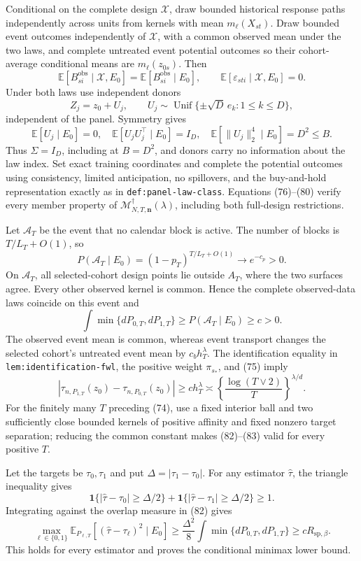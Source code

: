 Conditional on the complete design \(\mathscr X\), draw bounded historical response paths independently across units from kernels with mean \(m_\ell(X_{st})\).  Draw bounded event outcomes independently of \(\mathscr X\), with a common observed mean under the two laws, and complete untreated event potential outcomes so their cohort-average conditional means are \(m_\ell(z_{0s})\).  Then
\[
\mathbb E[B_{si}^{\mathrm{obs}}\mid\mathscr X,E_0]
=\mathbb E[B_{si}^{\mathrm{obs}}\mid E_0],
\qquad
\mathbb E[\varepsilon_{sti}\mid\mathscr X,E_0]=0.
\tag{79}
\]
Under both laws use independent donors
\[
Z_j=z_0+U_j,
\qquad
U_j\sim\operatorname{Unif}\{\pm\sqrt D\,e_k:1\leq k\leq D\},
\]
independent of the panel.  Symmetry gives
\[
\mathbb E[U_j\mid E_0]=0,
\quad
\mathbb E[U_jU_j^\top\mid E_0]=I_D,
\quad
\mathbb E[\|U_j\|_2^4\mid E_0]=D^2\leq B.
\tag{80}
\]
Thus \(\Sigma=I_D\), including at \(B=D^2\), and donors carry no information about the law index.  Set exact training coordinates and complete the potential outcomes using consistency, limited anticipation, no spillovers, and the buy-and-hold representation exactly as in \texttt{def:panel-law-class}.  Equations (76)--(80) verify every member property of \(\mathcal M_{N,T,\mathbf n}^{\dagger}(\lambda)\), including both full-design restrictions.

Let \(\mathcal A_T\) be the event that no calendar block is active.  The number of blocks is \(T/L_T+O(1)\), so
\[
P(\mathcal A_T\mid E_0)
=(1-p_T)^{T/L_T+O(1)}\longrightarrow e^{-c_p}>0.
\tag{81}
\]
On \(\mathcal A_T\), all selected-cohort design points lie outside \(A_T\), where the two surfaces agree.  Every other observed kernel is common.  Hence the complete observed-data laws coincide on this event and
\[
\int\min\{dP_{0,T},dP_{1,T}\}
\geq P(\mathcal A_T\mid E_0)\geq c>0.
\tag{82}
\]
The observed event mean is common, whereas event transport changes the selected cohort's untreated event mean by \(c_bh_T^\lambda\).  The identification equality in \texttt{lem:identification-fwl}, the positive weight \(\pi_{s_*}\), and (75) imply
\[
|\tau_{n,P_{1,T}}(z_0)-\tau_{n,P_{0,T}}(z_0)|
\geq ch_T^\lambda
\asymp\left\{\frac{\log(T\vee2)}T\right\}^{\lambda/d}.
\tag{83}
\]
For the finitely many \(T\) preceding (74), use a fixed interior ball and two sufficiently close bounded kernels of positive affinity and fixed nonzero target separation; reducing the common constant makes (82)--(83) valid for every positive \(T\).

Let the targets be \(\tau_0,\tau_1\) and put \(\Delta=|\tau_1-\tau_0|\).  For any estimator \(\widehat\tau\), the triangle inequality gives
\[
\mathbf1\{|\widehat\tau-\tau_0|\geq\Delta/2\}
+\mathbf1\{|\widehat\tau-\tau_1|\geq\Delta/2\}\geq1.
\]
Integrating against the overlap measure in (82) gives
\[
\max_{\ell\in\{0,1\}}
\mathbb E_{P_{\ell,T}}[(\widehat\tau-\tau_\ell)^2\mid E_0]
\geq\frac{\Delta^2}{8}\int\min\{dP_{0,T},dP_{1,T}\}
\geq cR_{\mathrm{sp},\beta}.
\tag{84}
\]
This holds for every estimator and proves the conditional minimax lower bound.

